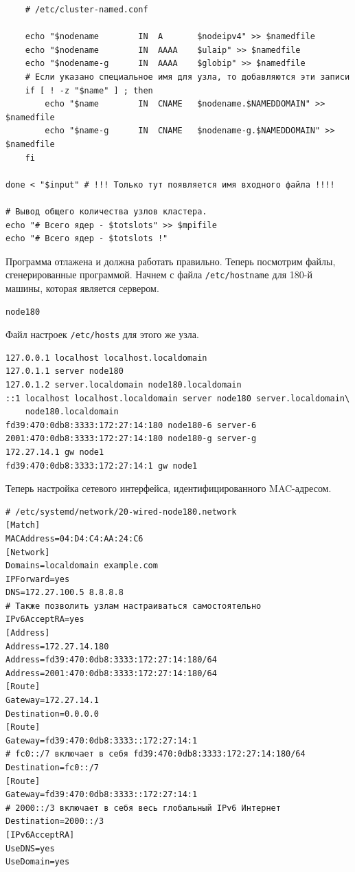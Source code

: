 \documentclass[a4paper,12pt,final,openany]{extbook}
\begin{document}
\begin{verbatim}
    # /etc/cluster-named.conf

    echo "$nodename        IN  A       $nodeipv4" >> $namedfile
    echo "$nodename        IN  AAAA    $ulaip" >> $namedfile
    echo "$nodename-g      IN  AAAA    $globip" >> $namedfile
    # Если указано специальное имя для узла, то добавляются эти записи
    if [ ! -z "$name" ] ; then
        echo "$name        IN  CNAME   $nodename.$NAMEDDOMAIN" >> $namedfile
        echo "$name-g      IN  CNAME   $nodename-g.$NAMEDDOMAIN" >> $namedfile
    fi

done < "$input" # !!! Только тут появляется имя входного файла !!!!

# Вывод общего количества узлов кластера.
echo "# Всего ядер - $totslots" >> $mpifile
echo "# Всего ядер - $totslots !"
\end{verbatim}

Программа отлажена и должна работать правильно. Теперь посмотрим файлы, сгенерированные программой. Начнем с файла \texttt{/etc/hostname} для 180-й машины, которая является сервером.
\begin{verbatim}
node180
\end{verbatim}

Файл настроек \texttt{/etc/hosts} для этого же узла.
\begin{verbatim}
127.0.0.1 localhost localhost.localdomain
127.0.1.1 server node180
127.0.1.2 server.localdomain node180.localdomain
::1 localhost localhost.localdomain server node180 server.localdomain\
    node180.localdomain
fd39:470:0db8:3333:172:27:14:180 node180-6 server-6
2001:470:0db8:3333:172:27:14:180 node180-g server-g
172.27.14.1 gw node1
fd39:470:0db8:3333:172:27:14:1 gw node1
\end{verbatim}

Теперь настройка сетевого интерфейса, идентифицированного MAC-адресом.
\begin{verbatim}
# /etc/systemd/network/20-wired-node180.network
[Match]
MACAddress=04:D4:C4:AA:24:C6
[Network]
Domains=localdomain example.com
IPForward=yes
DNS=172.27.100.5 8.8.8.8
# Также позволить узлам настраиваться самостоятельно
IPv6AcceptRA=yes
[Address]
Address=172.27.14.180
Address=fd39:470:0db8:3333:172:27:14:180/64
Address=2001:470:0db8:3333:172:27:14:180/64
[Route]
Gateway=172.27.14.1
Destination=0.0.0.0
[Route]
Gateway=fd39:470:0db8:3333::172:27:14:1
# fc0::/7 включает в себя fd39:470:0db8:3333:172:27:14:180/64
Destination=fc0::/7
[Route]
Gateway=fd39:470:0db8:3333::172:27:14:1
# 2000::/3 включает в себя весь глобальный IPv6 Интернет
Destination=2000::/3
[IPv6AcceptRA]
UseDNS=yes
UseDomain=yes
\end{verbatim}
\end{document}
